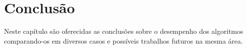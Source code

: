 \chapter{Conclusão}
\label{chap:conclusao}

Neste capítulo são oferecidas as conclusões sobre o desempenho dos algoritmos comparando-os em diversos casos e possíveis trabalhos futuros na mesma área.